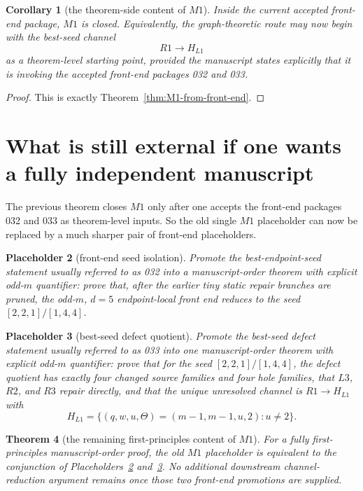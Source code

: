 \documentclass[11pt]{article}
\newtheorem{theorem}{Theorem}[section]
\newtheorem{corollary}[theorem]{Corollary}
\newtheorem{placeholder}[theorem]{Placeholder}
\newcommand{\HLone}{H_{L1}}
\begin{document}
\begin{corollary}[the theorem-side content of $M1$]
\label{cor:M1-closed-in-accepted-front-end-package}
Inside the current accepted front-end package, $M1$ is closed.
Equivalently, the graph-theoretic route may now begin with the best-seed
channel
\[
R1 \to \HLone
\]
as a theorem-level starting point, provided the manuscript states explicitly
that it is invoking the accepted front-end packages \textup{032} and
\textup{033}.
\end{corollary}

\begin{proof}
This is exactly Theorem~\ref{thm:M1-from-front-end}.
\end{proof}

\section{What is still external if one wants a fully independent manuscript}

The previous theorem closes $M1$ only after one accepts the front-end packages
\textup{032} and \textup{033} as theorem-level inputs.
So the old single $M1$ placeholder can now be replaced by a much sharper pair
of front-end placeholders.

\begin{placeholder}[front-end seed isolation]
\label{ph:032}
Promote the best-endpoint-seed statement usually referred to as
\textup{032} into a manuscript-order theorem with explicit odd-$m$ quantifier:
prove that, after the earlier tiny static repair branches are pruned, the
odd-$m$, $d=5$ endpoint-local front end reduces to the seed
$[2,2,1]/[1,4,4]$.
\end{placeholder}

\begin{placeholder}[best-seed defect quotient]
\label{ph:033}
Promote the best-seed defect statement usually referred to as \textup{033} into
one manuscript-order theorem with explicit odd-$m$ quantifier:
prove that for the seed $[2,2,1]/[1,4,4]$, the defect quotient has exactly
four changed source families and four hole families, that $L3$, $R2$, and $R3$
repair directly, and that the unique unresolved channel is
$R1\to \HLone$ with
\[
\HLone=
\{(q,w,u,\Theta)=(m-1,m-1,u,2): u\neq 2\}.
\]
\end{placeholder}

\begin{theorem}[the remaining first-principles content of $M1$]
\label{thm:M1-equals-two-front-end-promotions}
For a fully first-principles manuscript-order proof, the old $M1$ placeholder
is equivalent to the conjunction of Placeholders~\ref{ph:032}
and~\ref{ph:033}.
No additional downstream channel-reduction argument remains once those two
front-end promotions are supplied.
\end{theorem}
\end{document}
